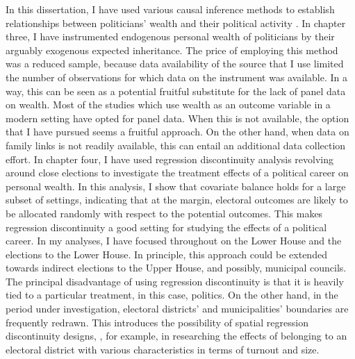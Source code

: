 In this dissertation, I have used various causal inference methods to establish relationships between politicians' wealth and their political activity \citep{cunningham2021causal}. In chapter three, I have instrumented endogenous personal wealth of politicians by their arguably exogenous expected inheritance. The price of employing this method was a reduced sample, because data availability of the source that I use limited the number of observations for which data on the instrument was available. In a way, this can be seen as a potential fruitful substitute for the lack of panel data on wealth. Most of the studies which use wealth as an outcome variable \citep{fisman2014private, berg2020politicians, berg2020returns} in a modern setting have opted for panel data. When this is not available, the option that I have pursued seems a fruitful approach. On the other hand, when data on family links is not readily available, this can entail an additional data collection effort. In chapter four, I have used regression discontinuity analysis revolving around close elections to investigate the treatment effects of a political career on personal wealth. In this analysis, I show that covariate balance holds for a large subset of settings, indicating that at the margin, electoral outcomes are likely to be allocated randomly with respect to the potential outcomes. This makes regression discontinuity a good setting for studying the effects of a political career. In my analyses, I have focused throughout on the Lower House and the elections to the Lower House. In principle, this approach could be extended towards indirect elections to the Upper House, and possibly, municipal councils. The principal disadvantage of using regression discontinuity is that it is heavily tied to a particular treatment, in this case, politics. On the other hand, in the period under investigation, electoral districts' and municipalities' boundaries are frequently redrawn. This introduces the possibility of spatial regression discontinuity designs, \citep[e.g.][]{dell2010persistent, egger2015causal, lowes2021concessions}, for example, in researching the effects of belonging to an electoral district with various characteristics in terms of turnout and size. 

